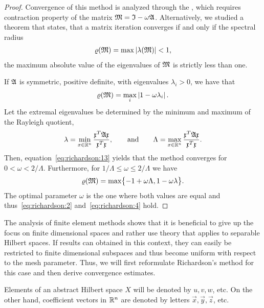 \begin{proof}
  Convergence of this method is analyzed through the , which requires contraction
  property of the matrix $\mathfrak{M} = \mathfrak{I} - \omega \mathfrak{A}$.
  Alternatively, we studied a theorem that
  states, that a matrix iteration converges if and only if the
  spectral radius
  \begin{gather*}
    \varrho(\mathfrak{M}) = \max \left|\lambda(\mathfrak{M})\right| < 1,
  \end{gather*}
  the maximum absolute value of the eigenvalues of $\mathfrak{M}$ is
  strictly less than one.
  
  If $\mathfrak{A}$ is symmetric, positive definite, with eigenvalues
  $\lambda_i > 0$, we have that
  \begin{gather}
    \label{eq:richardson:13}
    \varrho(\mathfrak{M}) = \max_i \left|1-\omega \lambda_i\right|.
  \end{gather}
  Let the extremal eigenvalues be determined by the minimum and
  maximum of the Rayleigh quotient,
  \begin{gather}
    \label{eq:richardson:3}
    \lambda
    = \min_{x\in \mathbb R^n} \frac{\mathfrak{x}^T\mathfrak{A}\mathfrak{x}}{\mathfrak{x}^T\mathfrak{x}},
    \qquad\text{and}\qquad
    \Lambda = \max_{x\in \mathbb R^n} \frac{\mathfrak{x}^T\mathfrak{A}\mathfrak{x}}{\mathfrak{x}^T\mathfrak{x}}.
  \end{gather}
  Then, equation~\eqref{eq:richardson:13} yields that the method
  converges for $0 < \omega < 2/\Lambda$. Furthermore, for 
  $1/\Lambda \le \omega \le 2/\Lambda$ we have
  \begin{gather*}
    \varrho(\mathfrak{M}) = \max \bigl\{ -1+\omega \Lambda,  1-\omega \lambda \bigr\}.
  \end{gather*}
  The optimal parameter $\omega$ is the one where both values are
  equal and thus~\eqref{eq:richardson:2} and~\eqref{eq:richardson:4} hold.
\end{proof}

\begin{intro}
  The analysis of finite element methods shows that it is beneficial
  to give up the focus on finite dimensional spaces and rather use
  theory that applies to separable Hilbert spaces. If results can
  obtained in this context, they can easily be restricted to finite
  dimensional subspaces and thus become uniform with respect to the
  mesh parameter. Thus, we will first reformulate Richardson's method
  for this case and then derive convergence estimates.
\end{intro}

\begin{intro}
  Elements of an abstract Hilbert space $X$ will be denoted by
  $u,v,w$, etc. On the other hand, coefficient vectors in $\mathbb R^n$ are
  denoted by letters $\vec x,\vec y,\vec z$, etc.
\end{intro}

